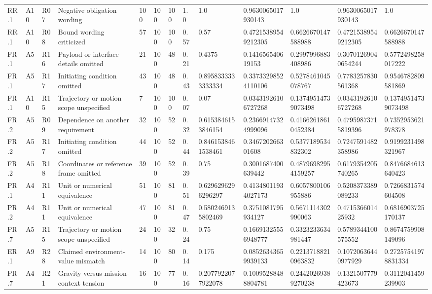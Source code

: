 \begin{tabular}{lllllllllllll}
RR.1 & A10 & R07 & Negative obligation wording & 100 & 100 & 100 & 1.0 & 1.0 & 0.9630065017930143 & 1.0 & 0.9630065017930143 & 1.0 \\
RR.1 & A10 & R08 & Bound wording criticized & 57 & 100 & 100 & 0.57 & 0.57 & 0.47215389549212305 & 0.6626670147588988 & 0.47215389549212305 & 0.6626670147588988 \\
FR.1 & A5 & R16 & Payload or interface details omitted & 21 & 100 & 48 & 0.21 & 0.4375 & 0.141656540619153 & 0.2997996883408986 & 0.30701269040654244 & 0.5772498258017222 \\
FR.1 & A5 & R17 & Initiating condition omitted & 43 & 100 & 48 & 0.43 & 0.8958333333333334 & 0.33733298524110106 & 0.5278461045078767 & 0.7783257830561368 & 0.9546782809581869 \\
FR.1 & A10 & R15 & Trajectory or motion scope unspecified & 7 & 100 & 100 & 0.07 & 0.07 & 0.03431926106727268 & 0.13749514739073498 & 0.03431926106727268 & 0.13749514739073498 \\
FR.2 & A5 & R09 & Dependence on another requirement & 32 & 100 & 52 & 0.32 & 0.6153846153846154 & 0.23669147324999096 & 0.41662618610452384 & 0.47959873715819396 & 0.7352953621978378 \\
FR.2 & A5 & R17 & Initiating condition omitted & 44 & 100 & 52 & 0.44 & 0.8461538461538461 & 0.346720266301608 & 0.5377189534832302 & 0.7247591482358986 & 0.9199231498321967 \\
FR.2 & A5 & R18 & Coordinates or reference frame omitted & 39 & 100 & 52 & 0.39 & 0.75 & 0.3001687400639442 & 0.48796982954159257 & 0.6179354205740265 & 0.8476684613640423 \\
PR.1 & A4 & R11 & Unit or numerical equivalence & 51 & 100 & 81 & 0.51 & 0.6296296296296297 & 0.41348011934027173 & 0.6057800106955886 & 0.5208373389089233 & 0.7266831574604508 \\
PR.2 & A4 & R11 & Unit or numerical equivalence & 47 & 100 & 81 & 0.47 & 0.5802469135802469 & 0.3751081795934127 & 0.5671114302990063 & 0.471536601425932 & 0.6816903725170137 \\
PR.7 & A5 & R15 & Trajectory or motion scope unspecified & 24 & 100 & 32 & 0.24 & 0.75 & 0.16691325556948777 & 0.3323233634981447 & 0.5789344100575552 & 0.8674759908149096 \\
ER.1 & A9 & R28 & Claimed environment-value mismatch & 14 & 100 & 80 & 0.14 & 0.175 & 0.08526343659939133 & 0.22137188210963832 & 0.10720636440977929 & 0.27257541978831334 \\
PR.7 & A4 & R21 & Gravity versus mission-context tension & 16 & 100 & 77 & 0.16 & 0.2077922077922078 & 0.10095288488804781 & 0.24420269389270238 & 0.1321507779423673 & 0.3112041459239903 \\

\end{tabular}
